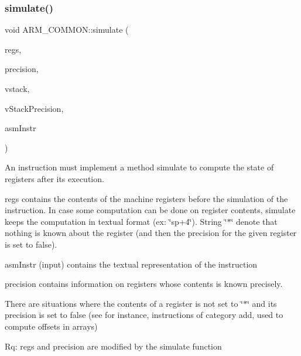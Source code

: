 \mbox{\label{classARM__COMMON_a89eb552311ce787557a976aee2fa2db6}} 
\subsubsection{\texorpdfstring{simulate()}{simulate()}}
{\footnotesize\ttfamily void A\+R\+M\+\_\+\+C\+O\+M\+M\+O\+N\+::simulate (\begin{DoxyParamCaption}\item[{\hyperlink{DAAInstruction_8h_af0fae93a861de9cf37988d5673cac523}{reg\+Table} \&}]{regs,  }\item[{\hyperlink{DAAInstruction_8h_a0e8cae02815a5f8adc750122d790b455}{reg\+Precision\+Table} \&}]{precision,  }\item[{\hyperlink{DAAInstruction_8h_a1b0e70ac1a04f06c8132055ed01f589f}{stack\+Type} \&}]{vstack,  }\item[{\hyperlink{DAAInstruction_8h_ac5cb793e9dac3fa9693da78b7e29ab30}{stack\+Prec\+Type} \&}]{v\+Stack\+Precision,  }\item[{const string \&}]{asm\+Instr }\end{DoxyParamCaption})\hspace{0.3cm}{\ttfamily [virtual]}}

An instruction must implement a method simulate to compute the state of registers after its execution.

regs contains the contents of the machine registers before the simulation of the instruction. In case some computation can be done on register contents, simulate keeps the computation in textual format (ex\+: \char`\"{}sp+4\char`\"{}). String \char`\"{}$\ast$\char`\"{} denote that nothing is known about the register (and then the precision for the given register is set to false).

asm\+Instr (input) contains the textual representation of the instruction

precision contains information on registers whose contents is known precisely.

There are situations where the contents of a register is not set to \char`\"{}$\ast$\char`\"{} and its precision is set to false (see for instance, instructions of category add, used to compute offsets in arrays)

Rq\+: regs and precision are modified by the simulate function 

